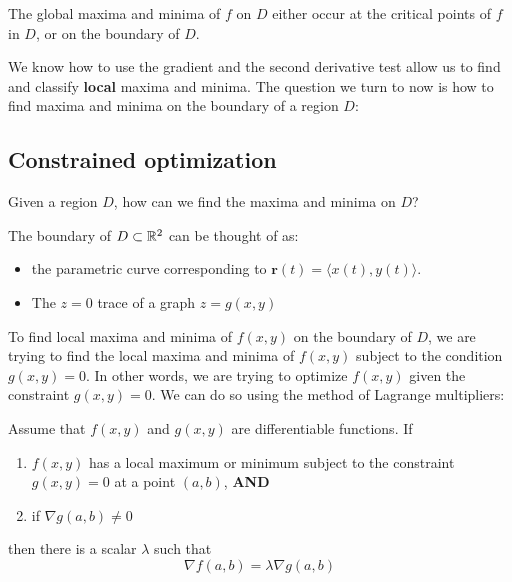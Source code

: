     \begin{theorem}
    The global maxima and minima of $f$ on $D$ either occur at the critical points of $f$ in $D$, or on the boundary of $D$.
    \end{theorem}

    We know how to use the gradient and the second derivative test allow us to find and classify \textbf{local} maxima and minima.  The question we turn to now is how to find maxima and minima on the boundary of a region $D$:

\subsection{Constrained optimization}

    \begin{motivating}
        Given a region $D$, how can we find the maxima and minima on $D$?
    \end{motivating}

\begin{remark}
    The boundary of $D \subset \mathbb{R}^2$ can be thought of as:
    
    \begin{itemize}
        \item the parametric curve corresponding to $\bm{r}(t) = \langle x(t),y(t) \rangle$.
        \item The $z=0$ trace of a graph $z = g(x,y)$
    \end{itemize}
    
    \end{remark}

    To find local maxima and minima of $f(x,y)$ on the boundary of $D$, we are trying to find the local maxima and minima of $f(x,y)$ subject to the condition $g(x,y) = 0$.  
    In other words, we are trying to optimize $f(x,y)$ given the constraint $g(x,y) = 0$.  We can do so using the method of Lagrange multipliers:
    
    \begin{theorem}
    Assume that $f(x,y)$ and $g(x,y)$ are differentiable functions.  If 
    \begin{enumerate}
        \item  $f(x,y)$ has a local maximum or minimum subject to the constraint $g(x,y)=0$ at a point $(a,b)$, \textbf{AND}
        \item if $\nabla g(a,b) \neq 0$
    \end{enumerate}
    
    then there is a scalar $\lambda$ such that 
    $$\nabla f(a,b) = \lambda \nabla g(a,b)$$
    \end{theorem}

